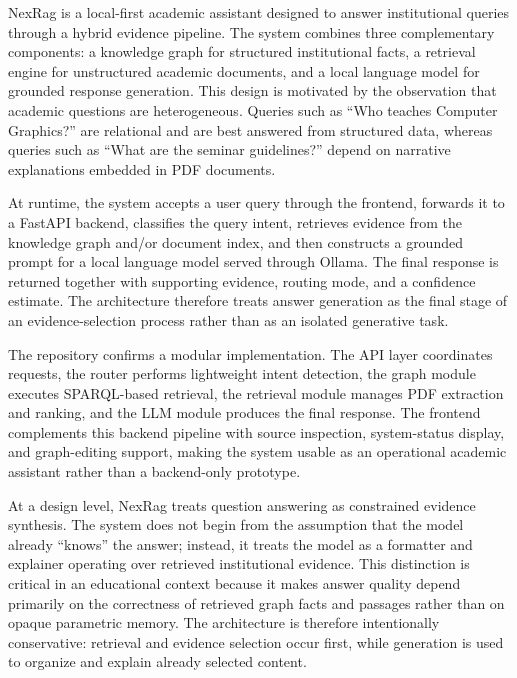 \newpage
{}
\label{chap:proposed-system}

\label{sec:proposed-overview}

\fontsize{12}{14}\selectfont

NexRag is a local-first academic assistant designed to answer institutional queries through a hybrid evidence pipeline. The system combines three complementary components: a knowledge graph for structured institutional facts, a retrieval engine for unstructured academic documents, and a local language model for grounded response generation. This design is motivated by the observation that academic questions are heterogeneous. Queries such as ``Who teaches Computer Graphics?'' are relational and are best answered from structured data, whereas queries such as ``What are the seminar guidelines?'' depend on narrative explanations embedded in PDF documents.

At runtime, the system accepts a user query through the frontend, forwards it to a FastAPI backend, classifies the query intent, retrieves evidence from the knowledge graph and/or document index, and then constructs a grounded prompt for a local language model served through Ollama. The final response is returned together with supporting evidence, routing mode, and a confidence estimate. The architecture therefore treats answer generation as the final stage of an evidence-selection process rather than as an isolated generative task.

The repository confirms a modular implementation. The API layer coordinates requests, the router performs lightweight intent detection, the graph module executes SPARQL-based retrieval, the retrieval module manages PDF extraction and ranking, and the LLM module produces the final response. The frontend complements this backend pipeline with source inspection, system-status display, and graph-editing support, making the system usable as an operational academic assistant rather than a backend-only prototype.

At a design level, NexRag treats question answering as constrained evidence synthesis. The system does not begin from the assumption that the model already ``knows'' the answer; instead, it treats the model as a formatter and explainer operating over retrieved institutional evidence. This distinction is critical in an educational context because it makes answer quality depend primarily on the correctness of retrieved graph facts and passages rather than on opaque parametric memory. The architecture is therefore intentionally conservative: retrieval and evidence selection occur first, while generation is used to organize and explain already selected content.

